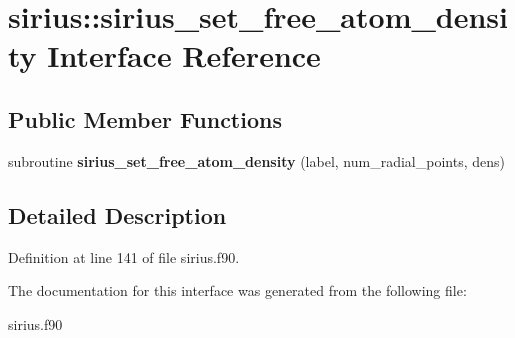 \hypertarget{interfacesirius_1_1sirius__set__free__atom__density}{}\section{sirius\+:\+:sirius\+\_\+set\+\_\+free\+\_\+atom\+\_\+density Interface Reference}
\label{interfacesirius_1_1sirius__set__free__atom__density}
\subsection*{Public Member Functions}
\begin{DoxyCompactItemize}
\item 
\hypertarget{interfacesirius_1_1sirius__set__free__atom__density_a4ee8e0d4ffc8303d41c06aafdf6d4cf3}{}subroutine {\bfseries sirius\+\_\+set\+\_\+free\+\_\+atom\+\_\+density} (label, num\+\_\+radial\+\_\+points, dens)\label{interfacesirius_1_1sirius__set__free__atom__density_a4ee8e0d4ffc8303d41c06aafdf6d4cf3}

\end{DoxyCompactItemize}


\subsection{Detailed Description}


Definition at line 141 of file sirius.\+f90.



The documentation for this interface was generated from the following file\+:\begin{DoxyCompactItemize}
\item 
sirius.\+f90\end{DoxyCompactItemize}
